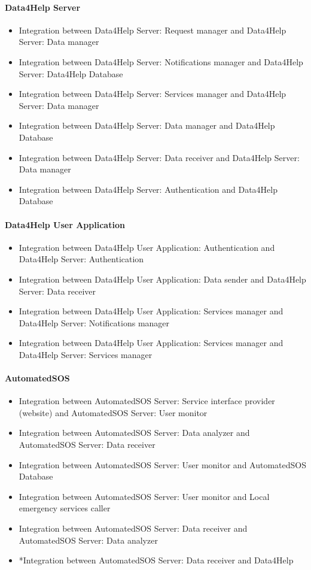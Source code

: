 \documentclass[../DD.tex]{subfiles}
\begin{document}
		\paragraph{Data4Help Server}
		\begin{itemize}
			\item{Integration between Data4Help Server: Request manager and Data4Help Server: Data manager}
			\item{Integration between Data4Help Server: Notifications manager and Data4Help Server: Data4Help Database}
			\item{Integration between Data4Help Server: Services manager and Data4Help Server: Data manager}
			\item{Integration between Data4Help Server: Data manager and Data4Help Database}
			\item{Integration between Data4Help Server: Data receiver and Data4Help Server: Data manager}
			\item{Integration between Data4Help Server: Authentication and Data4Help Database}
		\end{itemize}

		\paragraph{Data4Help User Application}
		\begin{itemize}
			\item{Integration between Data4Help User Application: Authentication and Data4Help Server: Authentication}
			\item{Integration between Data4Help User Application: Data sender and Data4Help Server: Data receiver}
			\item{Integration between Data4Help User Application: Services manager and Data4Help Server: Notifications manager}
			\item{Integration between Data4Help User Application: Services manager and Data4Help Server: Services manager}
		\end{itemize}

		\paragraph{AutomatedSOS}
		\begin{itemize}
			\item{Integration between AutomatedSOS Server: Service interface provider (website) and AutomatedSOS Server: User monitor}
			\item{Integration between AutomatedSOS Server: Data analyzer and AutomatedSOS Server: Data receiver}
			\item{Integration between AutomatedSOS Server: User monitor and AutomatedSOS Database}
			\item{Integration between AutomatedSOS Server: User monitor and Local emergency services caller}
			\item{Integration between AutomatedSOS Server: Data receiver and AutomatedSOS Server: Data analyzer}
			\item{*Integration between AutomatedSOS Server: Data receiver and Data4Help}
		\end{itemize}
\end{document}
